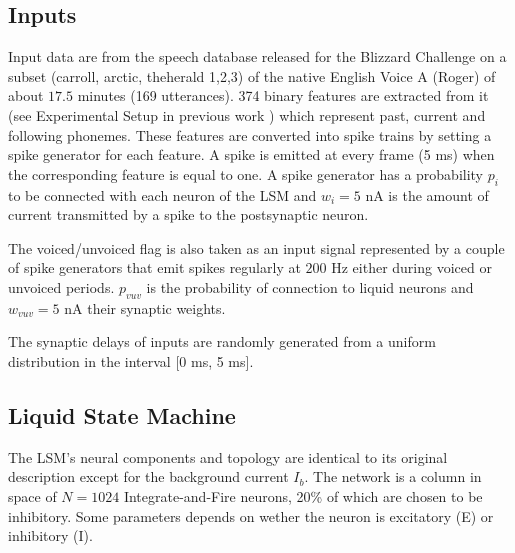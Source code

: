 \documentclass[11pt, a4paper]{article} %
\begin{document}
\subsection{Inputs}
Input data are from the speech database released for the Blizzard Challenge \cite{karaiskos2008blizzard} on a subset (carroll, arctic, theherald 1,2,3) of the native English Voice A (Roger) of about $17.5$ minutes (169 utterances). 374 binary features are extracted from it (see Experimental Setup in previous work \cite{schnell2018neural}) which represent past, current and following phonemes. These features are converted into spike trains by setting a spike generator for each feature. A spike is emitted at every frame (5 ms) when the corresponding feature is equal to one.
A spike generator has a probability $p_i$ to be connected with each neuron of the LSM and $w_i = 5$ nA is the amount of current transmitted by a spike to the postsynaptic neuron. 

The voiced/unvoiced flag is also taken as an input signal represented by a couple of spike generators that emit spikes regularly at $200$ Hz either during voiced or unvoiced periods. $p_{vuv}$ is the probability of connection to liquid neurons and $w_{vuv} = 5$ nA their synaptic weights.

The synaptic delays of inputs are randomly generated from a uniform distribution in the interval [0 ms, 5 ms].

\subsection{Liquid State Machine}

The LSM's neural components and topology are identical to its original description \cite{maass2002real} except for the background current $I_b$. The network is a column in space of $N = 1024$ Integrate-and-Fire neurons, 20\% of which are chosen to be inhibitory. Some parameters depends on wether the neuron is excitatory (E) or inhibitory (I).
\end{document}
